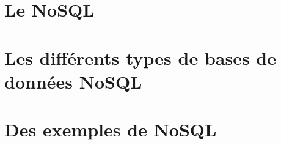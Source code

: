\documentclass[11pt]{article}
\title{\color{blue}\titre}
\author{\eleves}
\date{\today}
\begin{document}
\maketitle
\thispagestyle{empty}
  
\section*{Le NoSQL}


\section*{Les différents types de bases de données NoSQL}


\section*{Des exemples de NoSQL}


\printindex



\end{document}
